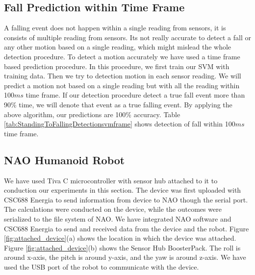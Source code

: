 \documentclass[letterpaper]{article}
\begin{document}
\subsection*{Fall Prediction within Time Frame}

A falling event does not happen within a single reading from sensors, it is consists of multiple
reading from sensors.  Its not really accurate to detect a fall or any other motion based on a
single reading, which might mislead the whole detection procedure. To detect a motion accurately we
have used a time frame based prediction procedure. In this procedure, we first train our SVM with
training data. Then we try to detection motion in each sensor reading. We will predict a motion not
based on a single reading but with all the reading within 100$ms$ time frame. If our detection
procedure detect a true fall event more than 90\% time, we will denote that event as a true
falling event. By applying the above algorithm, our predictions are 100\% accuracy.
Table \ref{tab:StandingToFallingDetectionsvmframe} shows detection of fall within 100$ms$ time
frame.
 
%

\subsection{NAO Humanoid Robot}

We have used Tiva C microcontroller with sensor hub attached to it to conduction our experiments in
this section. The device was first uploaded with CSC688 Energia to send information from device to
NAO though the serial port. The calculations were conducted on the device, while the outcomes were
serialized to the file system of NAO. We have integrated NAO software and CSC688 Energia to send and
received data from the device and the robot. Figure \ref{fig:attached_device}(a) shows the location
in which the device was attached. Figure \ref{fig:attached_device}(b) shows the Sensor Hub
BoosterPack. The roll is around x-axis, the pitch is around y-axis, and the yaw is around z-axis. 
We have used the USB port of the robot to communicate with the device.  
\end{document}
